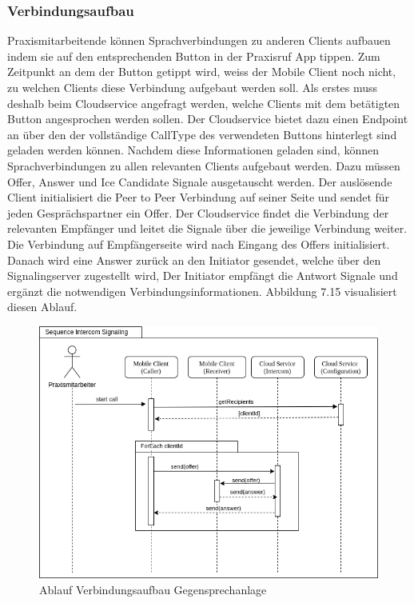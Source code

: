 \clearpage

\subsubsection{Verbindungsaufbau}

Praxismitarbeitende können Sprachverbindungen zu anderen Clients aufbauen indem sie auf den entsprechenden Button in der Praxisruf App tippen.
Zum Zeitpunkt an dem der Button getippt wird, weiss der Mobile Client noch nicht, zu welchen Clients diese Verbindung aufgebaut werden soll.
Als erstes muss deshalb beim Cloudservice angefragt werden, welche Clients mit dem betätigten Button angesprochen werden sollen.
Der Cloudservice bietet dazu einen Endpoint an über den der vollständige CallType des verwendeten Buttons hinterlegt sind geladen werden können.
Nachdem diese Informationen geladen sind, können Sprachverbindungen zu allen relevanten Clients aufgebaut werden.
Dazu müssen Offer, Answer und Ice Candidate Signale ausgetauscht werden.
Der auslösende Client initialisiert die Peer to Peer Verbindung auf seiner Seite und sendet für jeden Gesprächspartner ein Offer.
Der Cloudservice findet die Verbindung der relevanten Empfänger und leitet die Signale über die jeweilige Verbindung weiter.
Die Verbindung auf Empfängerseite wird nach Eingang des Offers initialisiert.
Danach wird eine Answer zurück an den Initiator gesendet, welche über den Signalingserver zugestellt wird,
Der Initiator empfängt die Antwort Signale und ergänzt die notwendigen Verbindungsinformationen.
Abbildung 7.15 visualisiert diesen Ablauf.

\begin{figure}[h]
    \centering
    \begin{minipage}[b]{0.9\textwidth}
        \includegraphics[width=\textwidth]{graphics/diagramms/Sequence_Intercom_Broking_V02}
        \caption{Ablauf Verbindungsaufbau Gegensprechanlage}
    \end{minipage}
\end{figure}

